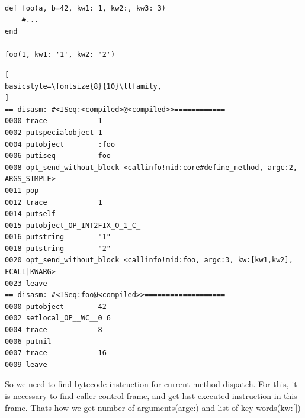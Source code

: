 \documentclass[conference]{IEEEtran}
\begin{document}
\begin{lstlisting}
def foo(a, b=42, kw1: 1, kw2:, kw3: 3)
    #...
end
 
foo(1, kw1: '1', kw2: '2')
\end{lstlisting}
\begin{lstlisting}[
basicstyle=\fontsize{8}{10}\ttfamily,
]
== disasm: #<ISeq:<compiled>@<compiled>>============
0000 trace            1
0002 putspecialobject 1
0004 putobject        :foo
0006 putiseq          foo
0008 opt_send_without_block <callinfo!mid:core#define_method, argc:2, ARGS_SIMPLE>
0011 pop
0012 trace            1                                               
0014 putself          
0015 putobject_OP_INT2FIX_O_1_C_ 
0016 putstring        "1"
0018 putstring        "2"
0020 opt_send_without_block <callinfo!mid:foo, argc:3, kw:[kw1,kw2], FCALL|KWARG>
0023 leave
== disasm: #<ISeq:foo@<compiled>>===================
0000 putobject        42
0002 setlocal_OP__WC__0 6
0004 trace            8
0006 putnil
0007 trace            16
0009 leave    
\end{lstlisting}
So we need to find bytecode instruction for current method dispatch. For this, it is necessary to find caller control
frame, and get last executed instruction in this frame. Thats how we get number of arguments(argc:) and list of key words(kw:[])
\end{document}
